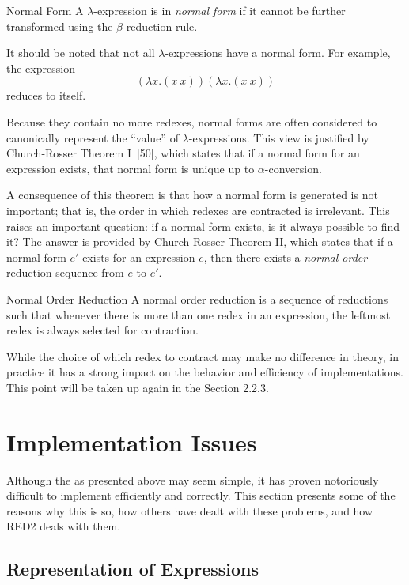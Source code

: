 \begin{insetdefinition}{Normal Form}
A \(\lambda\)-expression is in \emph{normal form} if it cannot be further
transformed using the \(\beta\)-reduction rule.
\end{insetdefinition}

It should be noted that not all \(\lambda\)-expressions have a normal form. For
example, the expression
\[
(\lambda x.(x\ x))(\lambda x.(x\ x))
\]
reduces to itself.

Because they contain no more redexes, normal forms are often considered to
canonically represent the ``value'' of \(\lambda\)-expressions. This view is
justified by Church-Rosser Theorem I~[50], which states that if a normal form
for an expression exists, that normal form is unique up to \(\alpha\)-conversion.

A consequence of this theorem is that how a normal form is generated is not
important; that is, the order in which redexes are contracted is irrelevant.
This raises an important question: if a normal form exists, is it always
possible to find it? The answer is provided by Church-Rosser Theorem II, which
states that if a normal form \(e'\) exists for an expression \(e\), then there
exists a \emph{normal order} reduction sequence from \(e\) to \(e'\).

\begin{insetdefinition}{Normal Order Reduction}
A normal order reduction is a sequence of reductions such that whenever there is
more than one redex in an expression, the leftmost redex is always selected for
contraction.
\end{insetdefinition}

While the choice of which redex to contract may make no difference in theory, in
practice it has a strong impact on the behavior and efficiency of
\lambdacalculus{} implementations. This point will be taken up again in the
Section 2.2.3.

\section{Implementation Issues}

Although the \lambdacalculus{} as presented above may seem simple, it has proven
notoriously difficult to implement efficiently and correctly. This section
presents some of the reasons why this is so, how others have dealt with these
problems, and how RED2 deals with them.

\subsection{Representation of Expressions}

